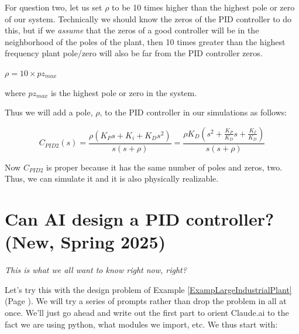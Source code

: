 




For question two, let us set $\rho$ to be 10 times higher than the highest pole or zero of our system.   Technically we should know the zeros of the PID controller to do this, but if we {\it assume} that the zeros of a good controller will be in the neighborhood of the poles of the plant, then 10 times greater than the highest frequency plant pole/zero will also be far from the PID controller zeros.	%

$\rho = 10\times pz_{max}$	%

where $pz_{max}$ is the highest pole or zero in the system.	%

Thus we will add a pole, $\rho$,  to the PID controller in our simulations as follows:	%

\[
C_{PID2}(s) = \frac{\rho(K_Ps+K_i + K_Ds^2)}{s(s+\rho)} = \frac{\rho K_D(s^2 + \frac{K_P}{K_D}s + \frac{K_I}{K_D})}{s(s+\rho)}
\]

Now $C_{PID2}$ is proper
because it has the same number of poles and zeros, two.  Thus, we can simulate it and it is also physically realizable.	%



\section{Can AI design a PID controller? (New, Spring 2025)}
\begin{center}
{\it This is what we all want to know right now, right? }
\end{center}
\vspace{0.2in}

Let's try this with the design problem of Example \ref{ExampLargeIndustrialPlant}
(Page \pageref{ExampLargeIndustrialPlant}).
We will try a series of prompts rather than drop the problem in all at once.
We'll
just go ahead and write out the first part to orient Claude.ai to the
fact we are using python, what modules we import, etc.  We thus start with:



